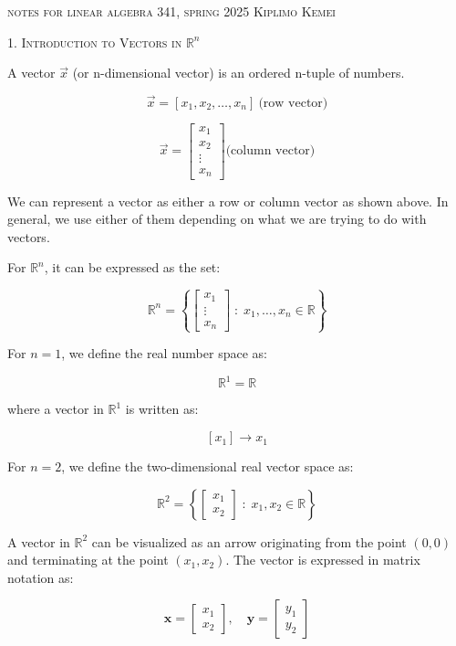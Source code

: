 \documentclass{article}
\begin{document}
\begin{center}
\textsc{notes for linear algebra 341, spring 2025}
\break
\textsc{Kiplimo Kemei}
\end{center}
\medskip

\begin{center}
    \textsc{{1. Introduction to Vectors in $\mathbb{R}^n$}}
\end{center}

A vector $\vec{x}$ (or n-dimensional vector) is an ordered n-tuple of numbers.

\[\vec{x} = [x_1,x_2,\dots,x_n] \ \text{(row vector)}\] 

\[\vec{x} =
\begin{bmatrix}
x_1 \\
x_2 \\
\vdots \\
x_n
\end{bmatrix}
\text{(column vector)}
\]

We can represent a vector as either a row or column vector as shown above. In general, we use either of them depending on what we are trying to do with vectors. 

\medskip
For $\mathbb{R}^n$, it can be expressed as the set:

\[
\mathbb{R}^n = \left\{ 
\begin{bmatrix}
x_1 \\
\vdots \\
x_n
\end{bmatrix}
\; : \; x_1, \dots, x_n \in \mathbb{R} \right\}
\]

For \( n = 1 \), we define the real number space as:

\[
\mathbb{R}^1 = \mathbb{R}
\]

where a vector in \( \mathbb{R}^1 \) is written as:

\[
[x_1] \to x_1
\]

For \( n = 2 \), we define the two-dimensional real vector space as:

\[
\mathbb{R}^2 = \left\{ \begin{bmatrix} x_1 \\ x_2 \end{bmatrix} \; : \; x_1, x_2 \in \mathbb{R} \right\}
\]

A vector in \( \mathbb{R}^2 \) can be visualized as an arrow originating from the point \( (0,0) \) and terminating at the point \( (x_1, x_2) \). The vector is expressed in matrix notation as:

\[
\mathbf{x} =
\begin{bmatrix} x_1 \\ x_2 \end{bmatrix}, \quad
\mathbf{y} =
\begin{bmatrix} y_1 \\ y_2 \end{bmatrix}
\]
\end{document}
